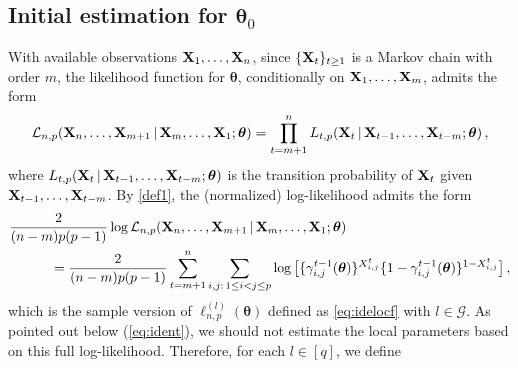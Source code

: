 \documentclass[12pt]{article}
\newcommand{\bTheta}{\boldsymbol \Theta}
\newcommand{\btheta}{\boldsymbol \theta}
\newcommand{\bX}{{\bf X}}
\newcommand{\cJ}{{\cal J}}
\newcommand{\0}{{\bf 0}}
\begin{document}
 



\subsection{Initial estimation for $\btheta_0$} \label{sec:initialEstimation}

With available observations $\bX_1, \ldots, \bX_n$, since $\{\bX_t\}_{t\geq1}$ is a Markov chain with order $m$, the likelihood function for $\btheta$, conditionally on
$\bX_1, \ldots, \bX_m$, admits the form
\[
\mathcal{L}_{n,p}(\bX_n, \ldots, \bX_{m+1}\,|\,\bX_m, \ldots, \bX_1; \btheta) =
\prod_{t=m+1}^n L_{t,p}(\bX_t \,|\, \bX_{t-1}, \ldots, \bX_{t-m};\btheta)\,,
\]
where $L_{t,p}(\bX_t \,|\, \bX_{t-1}, \ldots, \bX_{t-m};\btheta)$ is the transition probability of $\bX_t$ given $\bX_{t-1},\ldots,\bX_{t-m}$. 
By \eqref{def1}, the (normalized) log-likelihood admits the form
\begin{align} \label{eq:trueLoglikeli}
&\frac{2}{(n-m)p(p-1)}\log \mathcal{L}_{n,p}(\bX_n, \ldots, \bX_{m+1}\,|\,\bX_m, \ldots, \bX_1; \btheta)\\
&~~~~~~~~~=\frac{2}{(n-m)p(p-1)}\sum_{t=m+1}^n\sum_{i,j:\,1\leq i<j\leq p}\log\big[\{\gamma_{i,j}^{t-1}(\btheta)\}^{X_{i,j}^t}\{1-\gamma_{i,j}^{t-1}(\btheta)\}^{1-X_{i,j}^t}\big]\,,\notag
\end{align}
which is the sample version of $\ell_{n,p}^{(l)}(\btheta)$ defined as \eqref{eq:idelocf} with $l\in\mathcal{G}$.
As pointed out below (\ref{eq:ident}), we should not estimate the local parameters based on this full log-likelihood. Therefore, for each $l\in[q]$, we define 
%
\end{document}
